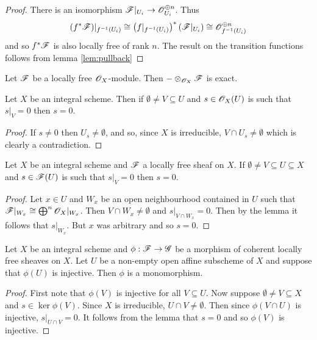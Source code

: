 \documentclass{memoir}
\begin{document}
\begin{proof}
    There is an isomorphism $\mathscr{F}|_{U_i}\to \mathscr{O}_{U_i}^{\oplus n}$.
    Thus 
    \begin{equation}
        (f^*\mathscr{F})|_{f^{-1}(U_i)}\cong \left(f|_{f^{-1}(U_i)}\right)^* (\mathscr{F}|_{U_i}) \cong \mathscr{O}_{f^{-1}(U_i)}^{\oplus n}
    \end{equation}
    and so $f^*\mathscr{F}$ is also locally free of rank $n$.
    The result on the transition functions follows from lemma \ref{lem:pullback}
\end{proof}
\begin{proposition}
    Let $\mathscr{F}$ be a locally free $\mathscr{O}_X$-module.
    Then $-\otimes_{\mathscr{O}_X}\mathscr{F}$ is exact.
\end{proposition}
\begin{lemma}
    Let $X$ be an integral scheme.
    Then if $\emptyset\ne V\subseteq U$ and $s\in \mathscr{O}_X(U)$ is such that $s|_V = 0$ then $s = 0$.
\end{lemma}
\begin{proof}
    If $s\ne 0$ then $U_s\ne \emptyset$, and so, since $X$ is irreducible, $V\cap U_s \ne \emptyset$ which is clearly a contradiction.
\end{proof}
\begin{lemma}
    Let $X$ be an integral scheme and $\mathscr{F}$ a locally free sheaf on $X$.
    If $\emptyset \ne V \subseteq U \subseteq X$ and $s\in \mathscr{F}(U)$ is such that $s|_V = 0$ then $s = 0$.
\end{lemma}
\begin{proof}
    Let $x\in U$ and $W_x$ be an open neighbourhood contained in $U$ such that $\mathscr{F}|_{W_x}\cong \bigoplus^n\mathscr{O}_X|_{W_x}$.
    Then $V\cap W_x \ne \emptyset$ and $s|_{V\cap W_x} = 0$.
    Then by the lemma it follows that $s|_{W_x}$.
    But $x$ was arbitrary and so $s=0$.
\end{proof}
\begin{proposition}
    Let $X$ be an integral scheme and $\phi:\mathscr{F}\to \mathscr{G}$ be a morphism of coherent locally free sheaves on $X$.
    Let $U$ be a non-empty open affine subscheme of $X$ and suppose that $\phi(U)$ is injective.
    Then $\phi$ is a monomorphism.
\end{proposition}
\begin{proof}
    First note that $\phi(V)$ is injective for all $V\subseteq U$.
    Now suppose $\emptyset \ne V\subseteq X$ and $s\in \ker\phi(V)$.
    Since $X$ is irreducible, $U\cap V \ne \emptyset$.
    Then since $\phi(V\cap U)$ is injective, $s|_{U\cap V} = 0$.
    It follows from the lemma that $s = 0$ and so $\phi(V)$ is injective.
\end{proof}
\end{document}
